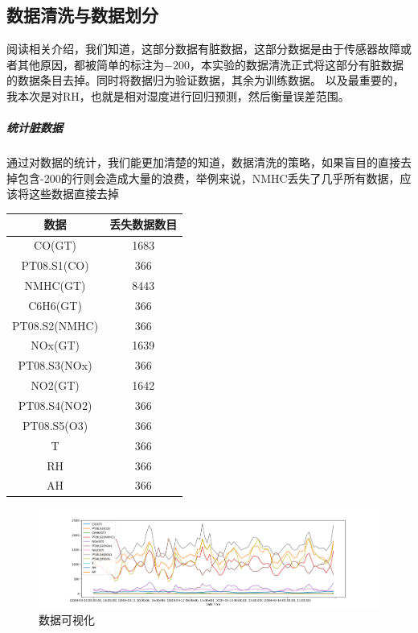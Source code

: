 \documentclass{ctexart}
\begin{document}
\subsection{数据清洗与数据划分}
阅读相关介绍，我们知道，这部分数据有脏数据，这部分数据是由于传感器故障或者其他原因，都被简单的标注为$-200$，本实验的数据清洗正式将这部分有脏数据的数据条目去掉。同时将数据归为验证数据，其余为训练数据。
以及最重要的，我本次是对RH，也就是相对湿度进行回归预测，然后衡量误差范围。
\subparagraph{统计脏数据} 通过对数据的统计，我们能更加清楚的知道，数据清洗的策略，如果盲目的直接去掉包含-200的行则会造成大量的浪费，举例来说，NMHC丢失了几乎所有数据，应该将这些数据直接去掉 \\
\begin{table}
	\centering
	\begin{tabular}{|c|c|}
		\hline
		数据 & 丢失数据数目 \\
		\hline
		CO(GT) & 1683 \\
		\hline
		PT08.S1(CO) & 366 \\
		\hline
		NMHC(GT) & 8443 \\
		\hline
		C6H6(GT) & 366 \\
		\hline
		PT08.S2(NMHC) & 366 \\
		\hline
		NOx(GT) & 1639 \\	
		\hline
		PT08.S3(NOx) & 366 \\
		\hline
		NO2(GT) & 1642 \\
		\hline
		PT08.S4(NO2) & 366 \\
		\hline
		PT08.S5(O3) & 366 \\
		\hline
		T & 366 \\
		\hline
		RH & 366 \\
		\hline
		AH & 366 \\
		\hline
	\end{tabular}
\end{table}
\begin{figure}[H]
	\includegraphics[width=1.2\textwidth]{../images/Figure_s.png}
	\caption{数据可视化}
\end{figure}
\end{document}
